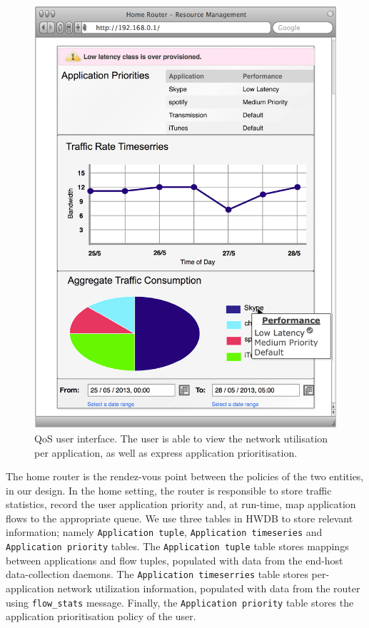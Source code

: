 \begin{figure}
  \centering
  \includegraphics[width=0.8\columnwidth]{homework_intf_qos}
  \caption[QoS user interface]{\label{fig:homework_intf_qos} QoS user interface.
    The user is able to view the network utilisation per application, as well as
    express application prioritisation.}
\end{figure}

The home router is the rendez-vous point between the policies of the two
entities, in our design. In the home setting, the router is responsible to store
traffic statistics, record the user application priority and, at run-time, map
application flows to the appropriate queue.  We use three tables in HWDB to
store relevant information; namely \texttt{Application tuple},
\texttt{Application timeseries} and \texttt{Application priority} tables.  The
\texttt{Application tuple} table stores mappings between applications and flow
tuples, populated with data from the end-host data-collection daemons.  The
\texttt{Application timeserries} table stores per-application network
utilization information, populated with data from the router using \of
\texttt{flow\_stats} message.  Finally, the \texttt{Application priority} table
stores the application prioritisation policy of the user. 

